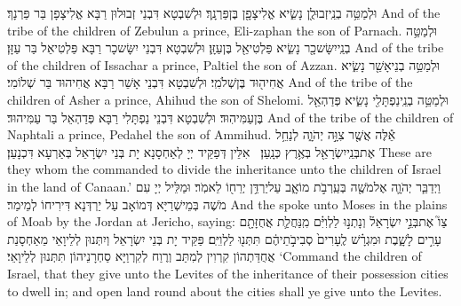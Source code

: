 {וּלְמַטֵּ֥ה בְנֵֽי\maqqaf זְבוּלֻ֖ן נָשִׂ֑יא אֱלִיצָפָ֖ן בֶּן\maqqaf פַּרְנָֽךְ׃}
{וּלְשִׁבְטָא דִּבְנֵי זְבוּלוּן רַבָּא אֱלִיצָפָן בַּר פַּרְנָךְ׃}
{And of the tribe of the children of Zebulun a prince, Eli-zaphan the son of Parnach.}{}
{וּלְמַטֵּ֥ה בְנֵֽי\maqqaf יִשָּׂשכָ֖ר נָשִׂ֑יא פַּלְטִיאֵ֖ל בֶּן\maqqaf עַזָּֽן׃}
{וּלְשִׁבְטָא דִּבְנֵי יִשָּׂשכָר רַבָּא פַּלְטִיאֵל בַּר עַזָּן׃}
{And of the tribe of the children of Issachar a prince, Paltiel the son of Azzan.}{}
{וּלְמַטֵּ֥ה בְנֵי\maqqaf אָשֵׁ֖ר נָשִׂ֑יא אֲחִיה֖וּד בֶּן\maqqaf שְׁלֹמִֽי׃}
{וּלְשִׁבְטָא דִּבְנֵי אָשֵׁר רַבָּא אֲחִיהוּד בַּר שְׁלוֹמִי׃}
{And of the tribe of the children of Asher a prince, Ahihud the son of Shelomi.}{}
{וּלְמַטֵּ֥ה בְנֵֽי\maqqaf נַפְתָּלִ֖י נָשִׂ֑יא פְּדַהְאֵ֖ל בֶּן\maqqaf עַמִּיהֽוּד׃}
{וּלְשִׁבְטָא דִּבְנֵי נַפְתָּלִי רַבָּא פְּדַהְאֵל בַּר עַמִּיהוּד׃}
{And of the tribe of the children of Naphtali a prince, Pedahel the son of Ammihud.}{}
{אֵ֕לֶּה אֲשֶׁ֖ר צִוָּ֣ה יְהֹוָ֑ה לְנַחֵ֥ל אֶת\maqqaf בְּנֵֽי\maqqaf יִשְׂרָאֵ֖ל בְּאֶ֥רֶץ כְּנָֽעַן׃ \petucha }
{אִלֵּין דְּפַקֵּיד יְיָ לְאַחְסָנָא יָת בְּנֵי יִשְׂרָאֵל בְּאַרְעָא דִּכְנָעַן׃}
{These are they whom the \lord\space commanded to divide the inheritance unto the children of Israel in the land of Canaan.’}{}
\newperek
{}
{וַיְדַבֵּ֧ר יְהֹוָ֛ה אֶל\maqqaf מֹשֶׁ֖ה בְּעַֽרְבֹ֣ת מוֹאָ֑ב עַל\maqqaf יַרְדֵּ֥ן יְרֵח֖וֹ לֵאמֹֽר׃}
{וּמַלֵּיל יְיָ עִם מֹשֶׁה בְּמֵישְׁרַיָּא דְּמוֹאָב עַל יַרְדְּנָא דִּירִיחוֹ לְמֵימַר׃}
{And the \lord\space spoke unto Moses in the plains of Moab by the Jordan at Jericho, saying:}{}
{צַו֮ אֶת\maqqaf בְּנֵ֣י יִשְׂרָאֵל֒ וְנָתְנ֣וּ לַלְוִיִּ֗ם מִֽנַּחֲלַ֛ת אֲחֻזָּתָ֖ם עָרִ֣ים לָשָׁ֑בֶת וּמִגְרָ֗שׁ לֶֽעָרִים֙ סְבִיבֹ֣תֵיהֶ֔ם תִּתְּנ֖וּ לַלְוִיִּֽם׃}
{פַּקֵּיד יָת בְּנֵי יִשְׂרָאֵל וְיִתְּנוּן לְלֵיוָאֵי מֵאַחְסָנַת אֲחֻדַּתְהוֹן קִרְוִין לְמִתַּב וְרֶוַח לְקִרְוַיָּא סַחְרָנֵיהוֹן תִּתְּנוּן לְלֵיוָאֵי׃}
{‘Command the children of Israel, that they give unto the Levites of the inheritance of their possession cities to dwell in; and open land round about the cities shall ye give unto the Levites.}{}
